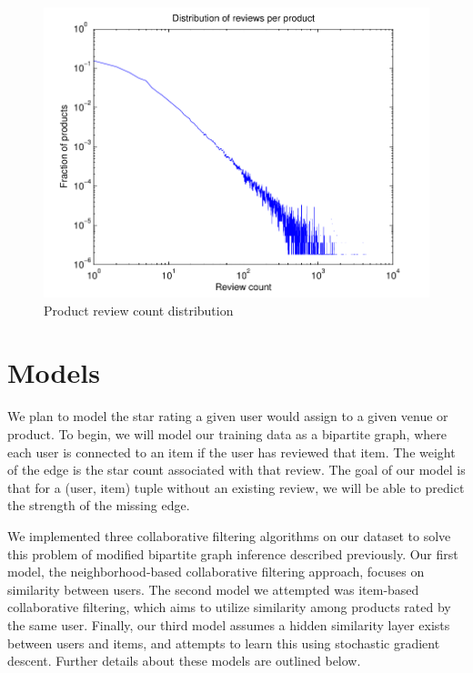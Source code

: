 \documentclass[letterpaper, 10 pt, twocolumn]{article}
\begin{document}
\begin{figure}[h]
\includegraphics[scale=0.6]{images/product_hist.pdf}
\caption{Product review count distribution}
\label{fig:producthist}
\end{figure}

\section{Models}
\label{sec:models}

We plan to model the star rating a given user would assign to a given
venue or product. To begin, we will model our training data as a bipartite
graph, where each user is connected to an item if the user has reviewed
that item. The weight of the edge is the star count associated with that
review. The goal of our model is that for a (user, item) tuple without an
existing review, we will be able to predict the strength of the missing
edge.

We implemented three collaborative filtering algorithms on our dataset to
solve this problem of modified bipartite graph inference described
previously. Our first model, the neighborhood-based collaborative
filtering approach, focuses on similarity between users. The second model
we attempted was item-based collaborative filtering, which aims to utilize
similarity among products rated by the same user. Finally, our third model
assumes a hidden similarity layer exists between users and items, and
attempts to learn this using stochastic gradient descent. Further details
about these models are outlined below.
\end{document}
